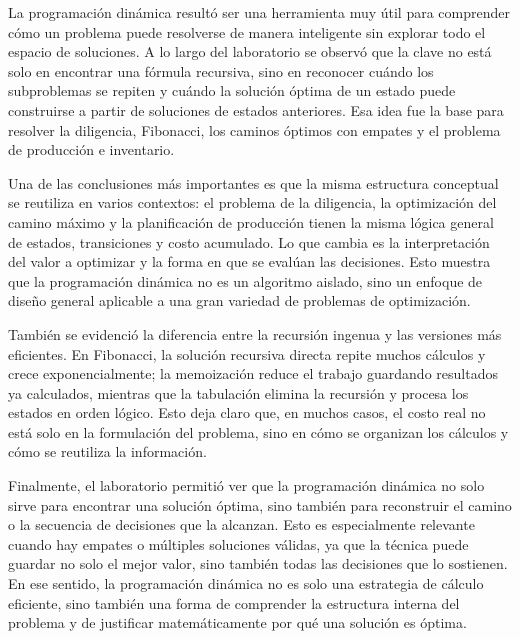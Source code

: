 \documentclass{article}
\begin{document}
La programación dinámica resultó ser una herramienta muy útil para comprender cómo un problema puede resolverse de manera inteligente sin explorar todo el espacio de soluciones. A lo largo del laboratorio se observó que la clave no está solo en encontrar una fórmula recursiva, sino en reconocer cuándo los subproblemas se repiten y cuándo la solución óptima de un estado puede construirse a partir de soluciones de estados anteriores. Esa idea fue la base para resolver la diligencia, Fibonacci, los caminos óptimos con empates y el problema de producción e inventario.

Una de las conclusiones más importantes es que la misma estructura conceptual se reutiliza en varios contextos: el problema de la diligencia, la optimización del camino máximo y la planificación de producción tienen la misma lógica general de estados, transiciones y costo acumulado. Lo que cambia es la interpretación del valor a optimizar y la forma en que se evalúan las decisiones. Esto muestra que la programación dinámica no es un algoritmo aislado, sino un enfoque de diseño general aplicable a una gran variedad de problemas de optimización.

También se evidenció la diferencia entre la recursión ingenua y las versiones más eficientes. En Fibonacci, la solución recursiva directa repite muchos cálculos y crece exponencialmente; la memoización reduce el trabajo guardando resultados ya calculados, mientras que la tabulación elimina la recursión y procesa los estados en orden lógico. Esto deja claro que, en muchos casos, el costo real no está solo en la formulación del problema, sino en cómo se organizan los cálculos y cómo se reutiliza la información.

Finalmente, el laboratorio permitió ver que la programación dinámica no solo sirve para encontrar una solución óptima, sino también para reconstruir el camino o la secuencia de decisiones que la alcanzan. Esto es especialmente relevante cuando hay empates o múltiples soluciones válidas, ya que la técnica puede guardar no solo el mejor valor, sino también todas las decisiones que lo sostienen. En ese sentido, la programación dinámica no es solo una estrategia de cálculo eficiente, sino también una forma de comprender la estructura interna del problema y de justificar matemáticamente por qué una solución es óptima.
\end{document}
